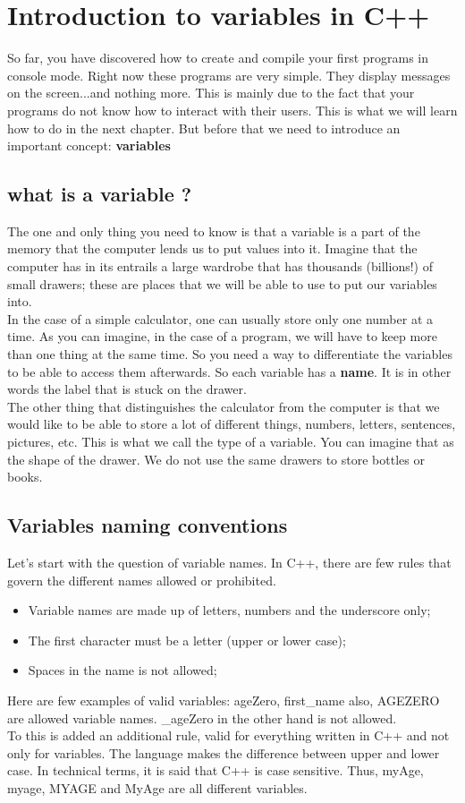 \documentclass[11pt, a4paper]{article}
\begin{document}
\newpage
\section{Introduction to variables in C++}
So far, you have discovered how to create and compile your first programs in console mode.
Right now these programs are very simple. They display messages on the screen...and nothing
more. This is mainly due to the fact that your programs do not know how to interact
with their users. This is what we will learn how to do in the next chapter. But before that we need
to introduce an important concept: \textbf{variables}

\subsection{what is a variable ?}
The one and only thing you need to know is that a variable is a part of the memory that the computer
lends us to put values into it. Imagine that the computer has in its entrails a large wardrobe that
has thousands (billions!) of small drawers; these are places that we will be able to
use to put our variables into.\\
In the case of a simple calculator, one can usually store only one number at a time. As you can
imagine, in the case of a program, we will have to keep more than one thing at the same time.
So you need a way to differentiate the variables to be able to access them afterwards.
So each variable has a \textbf{name}. It is in other words the label that is stuck on the drawer.
\\The other thing that distinguishes the calculator from the computer is that we would like to
be able to store a lot of different things, numbers, letters, sentences, pictures, etc.
This is what we call the type of a variable. You can imagine that as the shape of the drawer.
We do not use the same drawers to store bottles or books.

\subsection{Variables naming conventions}
Let’s start with the question of variable names. In C++, there are few rules that
govern the different names allowed or prohibited.
\begin{itemize}
\item Variable names are made up of letters, numbers and the underscore only;
\item The first character must be a letter (upper or lower case);
\item Spaces in the name is not allowed;
\end{itemize}
Here are few examples of valid variables: ageZero, first\_name also, AGEZERO are
allowed variable names. \_ageZero in the other hand is not allowed.\\
To this is added an additional rule, valid for everything written in C++ and not
only for variables. The language makes the difference between upper and lower case.
In technical terms, it is said that C++ is case sensitive. Thus, myAge, myage, MYAGE and
MyAge are all different variables.\\
\end{document}
